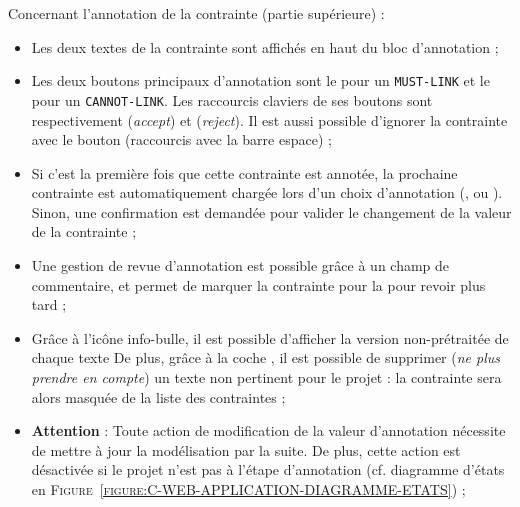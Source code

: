 			Concernant l'annotation de la contrainte (partie supérieure) :
			\begin{itemize}
				\item Les deux textes de la contrainte sont affichés en haut du bloc d'annotation ;
				\item Les deux boutons principaux d'annotation sont le \textguillemets{\textcolor{colorApplicationMUSTLINK}{\faEquals}} pour un \texttt{MUST-LINK} et le \textguillemets{\textcolor{colorApplicationCANNOTLINK}{\faNotEqual}} pour un \texttt{CANNOT-LINK}.
				Les raccourcis claviers de ses boutons sont respectivement  (\textit{accept}) et  (\textit{reject}).
				Il est aussi possible d'ignorer la contrainte avec le bouton \textguillemets{\textcolor{colorApplicationSKIP}{\faQuestion}} (raccourcis avec la barre espace) ;
				\item Si c'est la première fois que cette contrainte est annotée, la prochaine contrainte est automatiquement chargée lors d'un choix d'annotation (\textguillemets{\textcolor{colorApplicationMUSTLINK}{\faEquals}}, \textguillemets{\textcolor{colorApplicationCANNOTLINK}{\faNotEqual}} ou \textguillemets{\textcolor{colorApplicationSKIP}{\faQuestion}}).
				Sinon, une confirmation est demandée pour valider le changement de la valeur de la contrainte ;
				\item Une gestion de revue d'annotation est possible grâce à un champ de commentaire, et \textguillemets{\textcolor{colorApplicationREVIEW}{\faCheckSquare}} permet de marquer la contrainte pour la pour revoir plus tard ;
				\item Grâce à l'icône info-bulle, il est possible d'afficher la version non-prétraitée de chaque texte
				De plus, grâce à la coche \textguillemets{\textcolor{colorApplicationDELETE}{\faTrash}}, il est possible de supprimer (\textit{ne plus prendre en compte}) un texte non pertinent pour le projet : la contrainte sera alors masquée de la liste des contraintes ;
				\item \textbf{Attention} : Toute action de modification de la valeur d'annotation nécessite de mettre à jour la modélisation par la suite.
				De plus, cette action est désactivée si le projet n'est pas à l'étape d'annotation (cf. diagramme d'états en \textsc{Figure~\ref{figure:C-WEB-APPLICATION-DIAGRAMME-ETATS}}) ;
			\end{itemize}
			
